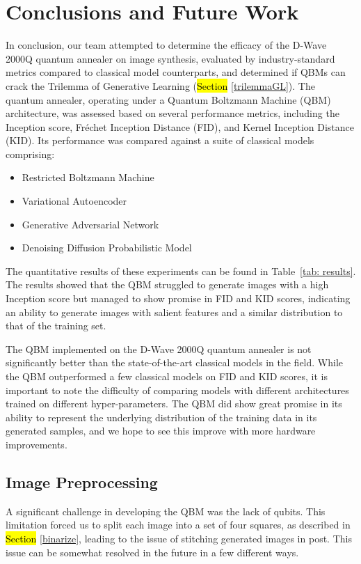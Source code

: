 \documentclass[technologies,article,accept,pdftex,moreauthors]{Definitions/mdpi}
\begin{document}
\section{Conclusions and Future Work}
\label{future}
In conclusion, our team attempted to determine the efficacy of the D-Wave 2000Q quantum annealer on image synthesis, evaluated by industry-standard metrics compared to classical model counterparts, and determined if QBMs can crack the Trilemma of Generative Learning (\hl{Section} \ref{trilemmaGL}). The quantum annealer, operating under a Quantum Boltzmann Machine (QBM) architecture, was assessed based on several performance metrics, including the Inception score, Fréchet Inception Distance (FID), and Kernel Inception Distance (KID). Its performance was compared against a suite of classical models comprising:
\begin{itemize}
\item Restricted Boltzmann Machine
\item Variational Autoencoder
\item Generative Adversarial Network
\item Denoising Diffusion Probabilistic Model
\end{itemize}


The quantitative results of these experiments can be found in Table~\ref{tab: results}. The results showed that the QBM struggled to generate images with a high Inception score but managed to show promise in FID and KID scores, indicating an ability to generate images with salient features and a similar distribution to that of the training set.


The QBM implemented on the D-Wave 2000Q quantum annealer is not significantly better than the state-of-the-art classical models in the field. While the QBM outperformed a few classical models on FID and KID scores, it is important to note the difficulty of comparing models with different architectures trained on different hyper-parameters. The QBM did show great promise in its ability to represent the underlying distribution of the training data in its generated samples, and we hope to see this improve with more hardware improvements.

\subsection{Image Preprocessing}
A significant challenge in developing the QBM was the lack of qubits. This limitation forced us to split each image into a set of four squares, as described in \hl{Section} \ref{binarize}, leading to the issue of stitching generated images in post. This issue can be somewhat resolved in the future in a few different ways.
\end{document}
